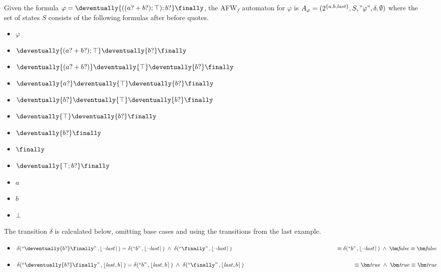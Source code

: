 \begin{example}
    Given the formula $\varphi= \deventually{((a? + b?);\top);b?}\finally$, the AFW$_f$ automaton for $\varphi$ is $A_\varphi =(2^{\{a,b,\mathit{last}\}},S,"\varphi",\delta,\emptyset)$ where the set of states $S$ consists of the following formulas after before quotes.
    \begin{multicols}{3}
        \small
        \begin{itemize}
        
            \item$\varphi$
            \item$\deventually{(a? + b?);\top}\deventually{b?}\finally$
            \item$\deventually{(a? + b?)}\deventually{\top}\deventually{b?}\finally$
            \item$\deventually{a?}\deventually{\top}\deventually{b?}\finally$
            \item$\deventually{b?}\deventually{\top}\deventually{b?}\finally$
            \item$\deventually{\top}\deventually{b?}\finally$
            \item$\deventually{b?}\finally$ 
            \item$\finally$ 
            \item$\deventually{\top;b?}\finally$
            \item$a$
            \item$b$
            \item$\bot$
        \end{itemize}
    \end{multicols}
    
    The transition $\delta$ is calculated below, omitting base cases and using the transitions from the last example.
    \small
    \begin{itemize}

        \item $\delta(\s{\deventually{b?}\finally},\interp{\neg \last})=
        \delta(\s{b},\interp{\neg \last}) \; \wedge \;
         \delta(\s{\finally},\interp{\neg \last})\\
        \phantom{\delta(\s{\deventually{b?}\finally},\interp{\neg \last})}\equiv
        \delta(\s{b},\interp{\neg \last})\;\wedge\;\fpbf \equiv \fpbf
        $

        \item $\delta(\s{\deventually{b?}\finally},\interp{\last,b})=
        \delta(\s{b},\interp{\last,b}) \; \wedge \;
         \delta(\s{\finally},\interp{\last,b})\\
        \phantom{\delta(\s{\deventually{b?}\finally},\interp{\last,b})}\equiv
        \tpbf\;\wedge\;\tpbf \equiv \tpbf
        $


\end{itemize}
\end{example}
